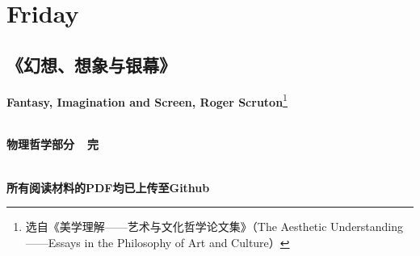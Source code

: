 \documentclass[12pt, a4paper, oneside]{ctexart}
\newcommand{\f}{\footnote}
\begin{document}
\section{Friday}
\subsection{《幻想、想象与银幕》}
\textbf{Fantasy, Imagination and Screen, Roger Scruton}\f{选自《美学理解——艺术与文化哲学论文集》（The Aesthetic Understanding——Essays in the Philosophy of Art and Culture）}

\hspace*{\fill} \\
\center
\textbf{\Huge{物理哲学部分\ \ 完}}

\hspace*{\fill} \\
\small\textbf{所有阅读材料的PDF均已上传至Github}
\end{document}

